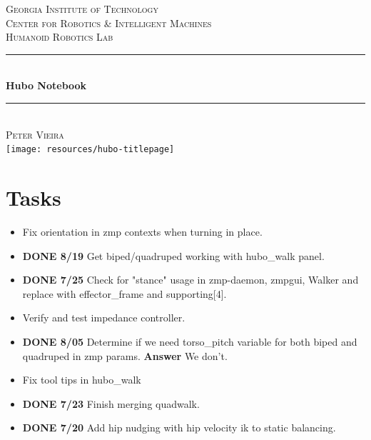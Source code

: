 \documentclass[letterpaper, 10 pt]{report}
\begin{document}
\begin{titlepage}
\center
\textsc{\LARGE Georgia Institute of Technology}\\[1.5cm]
\textsc{\large Center for Robotics \& Intelligent Machines}\\[0.5cm]
\textsc{\large Humanoid Robotics Lab}\\[0.5cm]
\rule{\linewidth}{0.5mm}\\[0.4cm]
{\huge \bfseries Hubo Notebook}\\[0.4cm]
\rule{\linewidth}{0.5mm}\\[1.5cm]
\textsc{\normalsize Peter Vieira}\\[1.5cm]
\texttt{[image: resources/hubo-titlepage]}
\vfill
\end{titlepage}


\section*{Tasks}
\begin{itemize}
\item Fix orientation in zmp contexts when turning in place.
\item \textbf{DONE 8/19} Get biped/quadruped working with hubo\_walk panel.
\item \textbf{DONE 7/25} Check for "stance" usage in zmp-daemon, zmpgui, Walker and replace with effector\_frame and supporting[4].
\item Verify and test impedance controller.
\item \textbf{DONE 8/05} Determine if we need torso\_pitch variable for both biped and quadruped in zmp params. \textbf{Answer} We don't.
\item Fix tool tips in hubo\_walk
\item \textbf{DONE 7/23} Finish merging quadwalk.
\item \textbf{DONE 7/20} Add hip nudging with hip velocity ik to static balancing.
\end{itemize}
\end{document}
